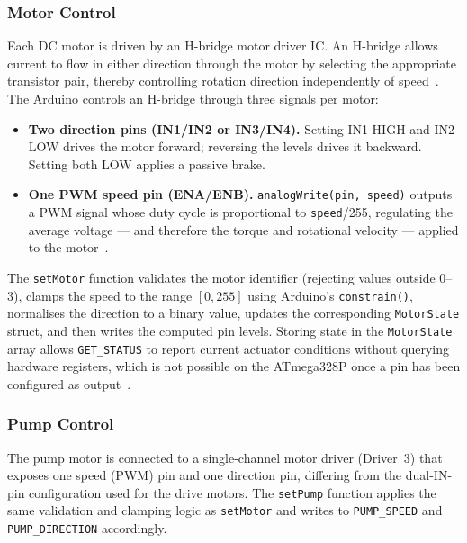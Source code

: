 \subsubsection{Motor Control}

Each DC motor is driven by an H-bridge motor driver IC. An H-bridge
allows current to flow in either direction through the motor by
selecting the appropriate transistor pair, thereby controlling rotation
direction independently of speed~\cite{horowitz2015art}. The Arduino
controls an H-bridge through three signals per motor:

\begin{itemize}
    \item \textbf{Two direction pins (IN1/IN2 or IN3/IN4).}
          Setting IN1 HIGH and IN2 LOW drives the motor forward;
          reversing the levels drives it backward. Setting both LOW
          applies a passive brake.
    \item \textbf{One PWM speed pin (ENA/ENB).}
          \texttt{analogWrite(pin, speed)} outputs a PWM signal
          whose duty cycle is proportional to \texttt{speed}/255,
          regulating the average voltage — and therefore the torque
          and rotational velocity — applied to the
          motor~\cite{monk2016electronics}.
\end{itemize}

The \texttt{setMotor} function validates the motor identifier
(rejecting values outside 0--3), clamps the speed to the range
$[0, 255]$ using Arduino's \texttt{constrain()}, normalises the
direction to a binary value, updates the corresponding \texttt{MotorState}
struct, and then writes the computed pin levels. Storing state in the
\texttt{MotorState} array allows \texttt{GET\_STATUS} to report
current actuator conditions without querying hardware registers,
which is not possible on the ATmega328P once a pin has been
configured as output~\cite{atmel2015atmega328p}.

\subsubsection{Pump Control}

The pump motor is connected to a single-channel motor driver (Driver~3)
that exposes one speed (PWM) pin and one direction pin, differing from
the dual-IN-pin configuration used for the drive motors. The
\texttt{setPump} function applies the same validation and clamping
logic as \texttt{setMotor} and writes to \texttt{PUMP\_SPEED} and
\texttt{PUMP\_DIRECTION} accordingly.

